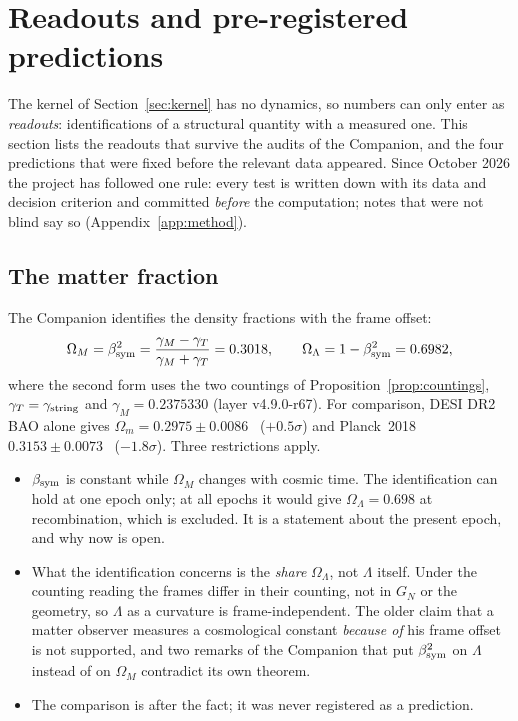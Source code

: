 \section{Readouts and pre-registered predictions}\label{sec:readouts}

The kernel of Section~\ref{sec:kernel} has no dynamics, so numbers can only enter as \emph{readouts}: identifications of a structural
quantity with a measured one.  This section lists the readouts that survive the audits of the Companion, and the four predictions
that were fixed before the relevant data appeared.  Since October 2026 the project has followed one rule: every test is written down with
its data and decision criterion and committed \emph{before} the computation; notes that were not blind say so (Appendix~\ref{app:method}).

\subsection{The matter fraction}

The Companion identifies the density fractions with the frame offset:
\[
\Omega_M=\beta_{\rm sym}^2=\frac{\gamma_M-\gamma_T}{\gamma_M+\gamma_T}=0.3018,\qquad \Omega_\Lambda=1-\beta_{\rm sym}^2=0.6982,
\]
where the second form uses the two countings of Proposition~\ref{prop:countings}, \(\gamma_T=\gamma_{\rm string}\) and \(\gamma_M=0.2375330\)
(layer v4.9.0-r67).  For comparison, DESI DR2 BAO alone gives \(\Omega_m=0.2975\pm0.0086\)~\cite{desi} (\(+0.5\sigma\)) and Planck~2018
\(0.3153\pm0.0073\)~\cite{planck} (\(-1.8\sigma\)).  Three restrictions apply.
\begin{itemize}
\item \(\beta_{\rm sym}\) is constant while \(\Omega_M\) changes with cosmic time.  The identification can hold at one epoch only; at all epochs it
would give \(\Omega_\Lambda=0.698\) at recombination, which is excluded.  It is a statement about the present epoch, and why now is open.
\item What the identification concerns is the \emph{share} \(\Omega_\Lambda\), not \(\Lambda\) itself.  Under the counting reading the frames differ
in their counting, not in \(G_N\) or the geometry, so \(\Lambda\) as a curvature is frame-independent.  The older claim that a matter observer
measures a cosmological constant \emph{because of} his frame offset is not supported, and two remarks of the Companion that put
\(\beta_{\rm sym}^2\) on \(\Lambda\) instead of on \(\Omega_M\) contradict its own theorem.
\item The comparison is after the fact; it was never registered as a prediction.
\end{itemize}

